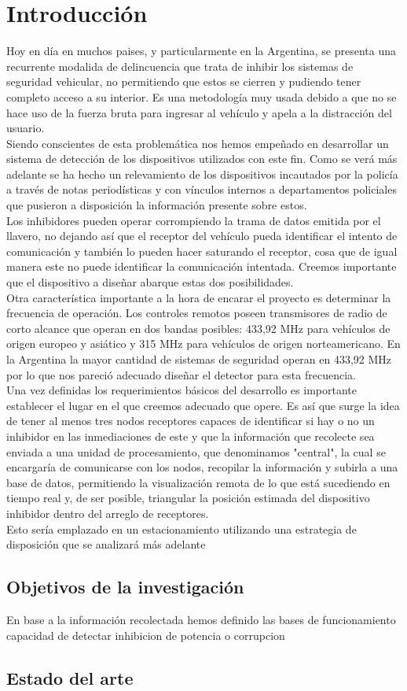 \documentclass[12pt]{report}
\begin{document}
\chapter{Introducción}
Hoy en día en muchos paises, y particularmente en la Argentina, se presenta una recurrente modalida de delincuencia que trata de 
inhibir los sistemas de seguridad vehicular, no permitiendo que estos se cierren y pudiendo tener completo acceso a su interior. Es 
una metodología muy usada debido a que no se hace uso de la fuerza bruta para ingresar al vehículo y apela a la distracción del usuario.\\
Siendo conscientes de esta problemática nos hemos empeñado en desarrollar un sistema de detección de los dispositivos utilizados
con este fin. Como se verá más adelante se ha hecho un relevamiento de los dispositivos incautados por la policía a través de notas
periodísticas y con vínculos internos a departamentos policiales que pusieron a disposición la información presente sobre estos.\\
Los inhibidores pueden operar corrompiendo la trama de datos emitida por el llavero, no dejando así que el receptor del vehículo 
pueda identificar el intento de comunicación y también lo pueden hacer saturando el receptor, cosa que de igual manera este no puede identificar
la comunicación intentada. Creemos importante que el dispositivo a diseñar abarque estas dos posibilidades. \\
Otra característica importante a la hora de encarar el proyecto es determinar la frecuencia de operación. Los controles remotos poseen transmisores
de radio de corto alcance que operan en dos bandas posibles: 433,92 MHz para vehículos de origen europeo y asiático y 315 MHz para vehículos de origen 
norteamericano. En la Argentina la mayor cantidad de sistemas de seguridad operan en 433,92 MHz por lo que nos pareció adecuado diseñar el
detector para esta frecuencia. \\
Una vez definidas los requerimientos básicos del desarrollo es importante establecer el lugar en el que creemos adecuado que opere. Es así
que surge la idea de tener al menos tres nodos receptores capaces de identificar si hay o no un inhibidor en las inmediaciones de este
y que la información que recolecte sea enviada a una unidad de procesamiento, que denominamos "central", la cual se encargaría de 
comunicarse con los nodos, recopilar la información y subirla a una base de datos, permitiendo la visualización remota de lo que está sucediendo 
en tiempo real y, de ser posible, triangular la posición estimada del dispositivo inhibidor dentro del arreglo de receptores.\\
Esto sería emplazado en un estacionamiento utilizando una estrategia de disposición que se analizará más adelante

\section{Objetivos de la investigación}
En base a la información recolectada hemos definido las bases de funcionamiento
capacidad de detectar inhibicion de potencia o corrupcion
\section{Estado del arte}
\pagebreak
\end{document}
